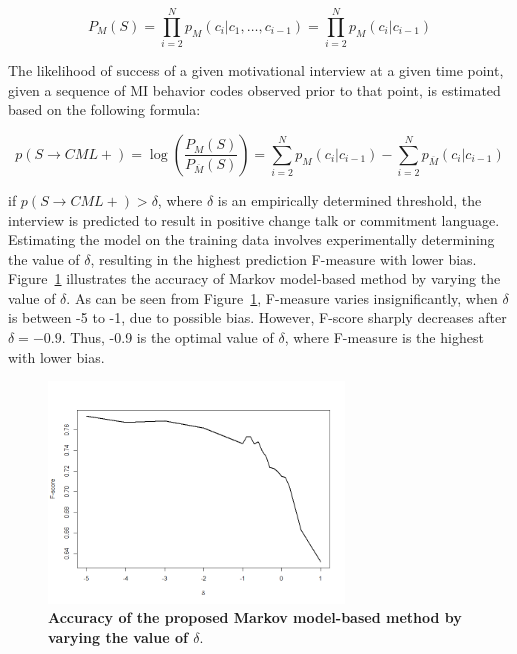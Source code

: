 \documentclass{amia}
\begin{document}
\begin{equation}
P_M(S) = \prod_{i=2}^N p_M(c_i|c_1,\dots,c_{i-1})=\prod_{i=2}^N p_M(c_i|c_{i-1})
\end{equation}

The likelihood of success of a given motivational interview at a given time point, given a sequence of MI behavior codes observed prior to that point, is estimated based on the following formula:

\begin{equation}
p(S\rightarrow CML+) = \log\left(\frac{P_M(S)}{P_{\overline M}(S)}\right)= \sum_{i=2}^N p_M(c_i|c_{i-1})-\sum_{i=2}^N p_{\overline M}(c_i|c_{i-1})\label{eq:class}
\end{equation}

if $p(S\rightarrow CML+) > \delta $, where $\delta$ is an empirically determined threshold, the interview is predicted to result in positive change talk or commitment language. Estimating the model on the training data involves experimentally determining the value of $\delta$, resulting in the highest prediction F-measure with lower bias. Figure~\ref{fig:delta} illustrates the accuracy of Markov model-based method by varying the value of $\delta$. As can be seen from Figure~\ref{fig:delta}, F-measure varies insignificantly, when $\delta $ is between -5 to -1, due to possible bias. However, F-score sharply decreases after $\delta = -0.9$. Thus, -0.9 is the optimal value of $\delta $, where F-measure is the highest with lower bias. 

\begin{figure}[htb!]
    \centering
    \includegraphics[width=0.70\textwidth]{figures/delta.png}
    \caption{\textbf{Accuracy of the proposed Markov model-based method by varying the value of $\delta$}.}
    \label{fig:delta}
\end{figure}
\end{document}
